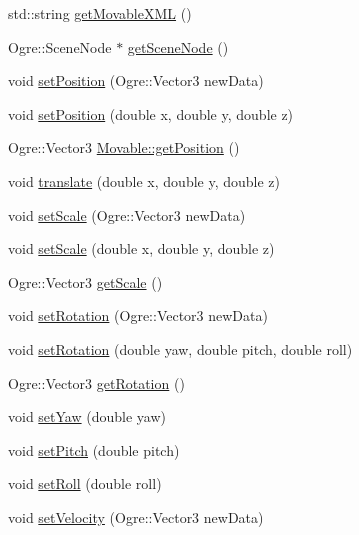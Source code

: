 \begin{DoxyCompactItemize}
\item 
std\-::string \hyperlink{class_rad_xml_1_1_movable_ad503030b7802dc348f047383d1c261d7}{get\-Movable\-X\-M\-L} ()
\item 
Ogre\-::\-Scene\-Node $\ast$ \hyperlink{class_rad_xml_1_1_movable_a49ab6bdee1afafdb05c12961bfaa7e2c}{get\-Scene\-Node} ()
\item 
void \hyperlink{class_rad_xml_1_1_movable_ae256f0b78c1a8f03370f3d549bd48bb6}{set\-Position} (Ogre\-::\-Vector3 new\-Data)
\item 
void \hyperlink{class_rad_xml_1_1_movable_a3d9d9507a90255d230b01e9f0f0b62d9}{set\-Position} (double x, double y, double z)
\item 
Ogre\-::\-Vector3 \hyperlink{class_rad_xml_1_1_movable_ab69347d861e351b88f317621b54b8e4e}{Movable\-::get\-Position} ()
\item 
void \hyperlink{class_rad_xml_1_1_movable_a97ced6b112dc3adb6bb65a96d6ec6541}{translate} (double x, double y, double z)
\item 
void \hyperlink{class_rad_xml_1_1_movable_a19859333de2fb83a3a587ad170e4d6b2}{set\-Scale} (Ogre\-::\-Vector3 new\-Data)
\item 
void \hyperlink{class_rad_xml_1_1_movable_a4d695254ab62abbc4c87644a5ed14e1b}{set\-Scale} (double x, double y, double z)
\item 
Ogre\-::\-Vector3 \hyperlink{class_rad_xml_1_1_movable_a352cfa186aaf137037f5b2ab34e83675}{get\-Scale} ()
\item 
void \hyperlink{class_rad_xml_1_1_movable_afd672527bbc7b6d6f2ee12a4c66bffef}{set\-Rotation} (Ogre\-::\-Vector3 new\-Data)
\item 
void \hyperlink{class_rad_xml_1_1_movable_aa316c744d7576472284f91ddee191bf0}{set\-Rotation} (double yaw, double pitch, double roll)
\item 
Ogre\-::\-Vector3 \hyperlink{class_rad_xml_1_1_movable_ab5cb621d9b1b333222eec4fb5fe19731}{get\-Rotation} ()
\item 
void \hyperlink{class_rad_xml_1_1_movable_aef3d5d3004921baaf715ef5e8934df16}{set\-Yaw} (double yaw)
\item 
void \hyperlink{class_rad_xml_1_1_movable_accfcc53830f8eee0d471a3fd2bf2e891}{set\-Pitch} (double pitch)
\item 
void \hyperlink{class_rad_xml_1_1_movable_a0b55bb5f2eaa28fafbd0fbdba0ade493}{set\-Roll} (double roll)
\item 
void \hyperlink{class_rad_xml_1_1_movable_aa6c2e8c8291325c41177c2dedce6307c}{set\-Velocity} (Ogre\-::\-Vector3 new\-Data)

\end{DoxyCompactItemize}
